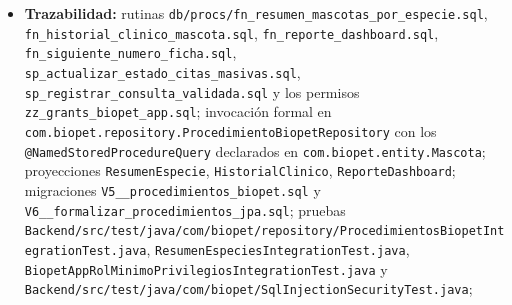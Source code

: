 \documentclass[
  spanish,
]{article}
\begin{document}
\begin{itemize}
  integración \texttt{Procedimientos\allowbreak{}Biopet\allowbreak{}Integration\allowbreak{}Test} (13 pruebas
  sobre las seis rutinas) y \texttt{Resumen\allowbreak{}Especies\allowbreak{}Integration\allowbreak{}Test},
  ambas con Testcontainers sobre PostgreSQL real (criterio 4);
  \texttt{docs/\allowbreak{}basedatos/\allowbreak{}CATALOGO-\allowbreak{}SP.\allowbreak{}md} (criterio 5).
\item
  \textbf{Trazabilidad:} rutinas
  \texttt{db/\allowbreak{}procs/\allowbreak{}fn\_\allowbreak{}resumen\_\allowbreak{}mascota\allowbreak{}s\_\allowbreak{}por\_\allowbreak{}especie.\allowbreak{}sql},
  \texttt{fn\_\allowbreak{}historial\_\allowbreak{}clini\allowbreak{}co\_\allowbreak{}mascota.\allowbreak{}sql},
  \texttt{fn\_\allowbreak{}reporte\_\allowbreak{}dashboa\allowbreak{}rd.\allowbreak{}sql},
  \texttt{fn\_\allowbreak{}siguiente\_\allowbreak{}numer\allowbreak{}o\_\allowbreak{}ficha.\allowbreak{}sql},
  \texttt{sp\_\allowbreak{}actualizar\_\allowbreak{}esta\allowbreak{}do\_\allowbreak{}citas\_\allowbreak{}masivas.\allowbreak{}sql},
  \texttt{sp\_\allowbreak{}registrar\_\allowbreak{}consu\allowbreak{}lta\_\allowbreak{}validada.\allowbreak{}sql} y los permisos
  \texttt{zz\_\allowbreak{}grants\_\allowbreak{}biopet\_\allowbreak{}ap\allowbreak{}p.\allowbreak{}sql}; invocación formal en
  \texttt{com.\allowbreak{}biopet.\allowbreak{}repository.\allowbreak{}Procedimiento\allowbreak{}Biopet\allowbreak{}Repository} con los
  \texttt{@Named\allowbreak{}Stored\allowbreak{}Procedure\allowbreak{}Query} declarados en
  \texttt{com.\allowbreak{}biopet.\allowbreak{}entity.\allowbreak{}Mascota}; proyecciones
  \texttt{Resumen\allowbreak{}Especie}, \texttt{Historial\allowbreak{}Clinico},
  \texttt{Reporte\allowbreak{}Dashboard}; migraciones
  \texttt{V5\_\allowbreak{}\_\allowbreak{}procedimientos\_\allowbreak{}b\allowbreak{}iopet.\allowbreak{}sql} y
  \texttt{V6\_\allowbreak{}\_\allowbreak{}formalizar\_\allowbreak{}proc\allowbreak{}edimientos\_\allowbreak{}jpa.\allowbreak{}sql}; pruebas
  \texttt{Backend/\allowbreak{}src/\allowbreak{}test/\allowbreak{}java/\allowbreak{}com/\allowbreak{}biopet/\allowbreak{}repository/\allowbreak{}Procedimientos\allowbreak{}Biopet\allowbreak{}Integration\allowbreak{}Test.\allowbreak{}java},
  \texttt{Resumen\allowbreak{}Especies\allowbreak{}Integration\allowbreak{}Test.\allowbreak{}java},
  \texttt{Biopet\allowbreak{}App\allowbreak{}Rol\allowbreak{}Minimo\allowbreak{}Privilegios\allowbreak{}Integration\allowbreak{}Test.\allowbreak{}java} y
  \texttt{Backend/\allowbreak{}src/\allowbreak{}test/\allowbreak{}java/\allowbreak{}com/\allowbreak{}biopet/\allowbreak{}Sql\allowbreak{}Injection\allowbreak{}Security\allowbreak{}Test.\allowbreak{}java};

\end{itemize}
\end{document}
